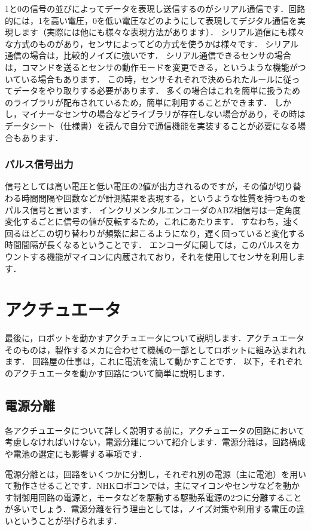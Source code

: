 1と0の信号の並びによってデータを表現し送信するのがシリアル通信です．回路的には，1を高い電圧，0を低い電圧などのようにして表現してデジタル通信を実現します（実際には他にも様々な表現方法があります）．
シリアル通信にも様々な方式のものがあり，センサによってどの方式を使うかは様々です．
シリアル通信の場合は，比較的ノイズに強いです．
シリアル通信できるセンサの場合は，コマンドを送るとセンサの動作モードを変更できる，というような機能がついている場合もあります．
この時，センサそれぞれで決められたルールに従ってデータをやり取りする必要があります．
多くの場合はこれを簡単に扱うためのライブラリが配布されているため，簡単に利用することができます．
しかし，マイナーなセンサの場合などライブラリが存在しない場合があり，その時はデータシート（仕様書）を読んで自分で通信機能を実装することが必要になる場合もあります．

\subsubsection{パルス信号出力}

信号としては高い電圧と低い電圧の2値が出力されるのですが，その値が切り替わる時間間隔や回数などが計測結果を表現する，というような性質を持つものをパルス信号と言います．
インクリメンタルエンコーダのABZ相信号は一定角度変化するごとに信号の値が反転するため，これにあたります．
すなわち，速く回るほどこの切り替わりが頻繁に起こるようになり，遅く回っていると変化する時間間隔が長くなるということです．
エンコーダに関しては，このパルスをカウントする機能がマイコンに内蔵されており，それを使用してセンサを利用します．


\section{アクチュエータ}

最後に，ロボットを動かすアクチュエータについて説明します．アクチュエータそのものは，製作するメカに合わせて機械の一部としてロボットに組み込まれれます．
回路屋の仕事は，これに電流を流して動かすことです．
以下，それぞれのアクチュエータを動かす回路について簡単に説明します．

\subsection{電源分離}

各アクチュエータについて詳しく説明する前に，アクチュエータの回路において考慮しなければいけない，電源分離について紹介します．電源分離は，回路構成や電池の選定にも影響する事項です．

電源分離とは，回路をいくつかに分割し，それぞれ別の電源（主に電池）を用いて動作させることです．NHKロボコンでは，主にマイコンやセンサなどを動かす制御用回路の電源と，モータなどを駆動する駆動系電源の2つに分離することが多いでしょう．電源分離を行う理由としては，ノイズ対策や利用する電圧の違いということが挙げられます．


